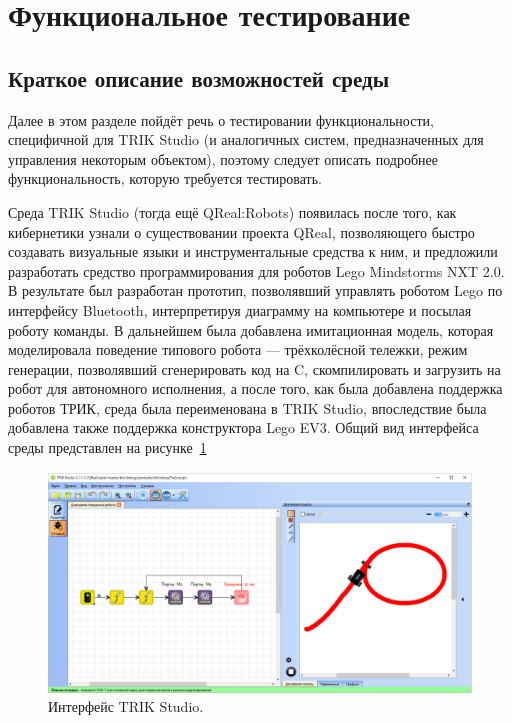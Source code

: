 \documentclass[conference]{IEEEtran}
\begin{document}
\section{Функциональное тестирование}
\subsection{Краткое описание возможностей среды}
Далее в этом разделе пойдёт речь о тестировании функциональности, специфичной для 
TRIK Studio (и аналогичных систем, предназначенных для управления некоторым объектом), 
поэтому следует описать подробнее функциональность, которую требуется тестировать. 

Среда TRIK Studio (тогда ещё QReal:Robots) появилась после того, как кибернетики узнали 
о существовании проекта QReal, позволяющего быстро создавать визуальные языки и инструментальные 
средства к ним, и предложили разработать средство программирования для роботов Lego Mindstorms NXT 2.0. 
В результате был разработан прототип, позволявший управлять роботом Lego по интерфейсу 
Bluetooth, интерпретируя диаграмму на компьютере и посылая роботу команды. В дальнейшем 
была добавлена имитационная модель, которая моделировала поведение типового робота --- 
трёхколёсной тележки, режим генерации, позволявший сгенерировать код на C, скомпилировать 
и загрузить на робот для автономного исполнения, а после того, как была добавлена 
поддержка роботов ТРИК, среда была переименована в TRIK Studio, впоследствие была добавлена 
также поддержка конструктора Lego EV3. Общий вид интерфейса среды представлен на рисунке~\ref{image:trikStudio}

\begin{figure}[!t]
	\centering
	\includegraphics[width=7in]{trikStudio.png}
	\caption{Интерфейс TRIK Studio.}
	\label{image:trikStudio}
\end{figure}
\end{document}
